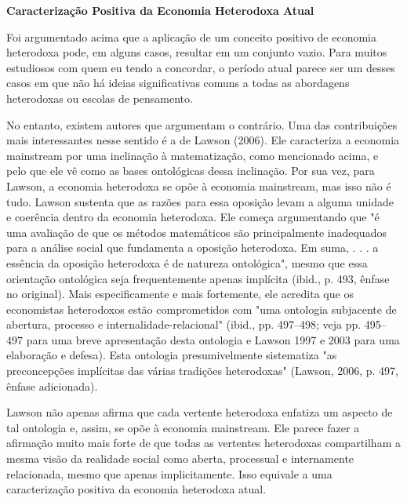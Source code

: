 \documentclass[12pt]{article}
\begin{document}
\textbf{Caracterização Positiva da Economia Heterodoxa Atual}

Foi argumentado acima que a aplicação de um conceito positivo de economia heterodoxa pode, em alguns casos, resultar em um conjunto vazio. Para muitos estudiosos com quem eu tendo a concordar, o período atual parece ser um desses casos em que não há ideias significativas comuns a todas as abordagens heterodoxas ou escolas de pensamento.

No entanto, existem autores que argumentam o contrário. Uma das contribuições mais interessantes nesse sentido é a de Lawson (2006). Ele caracteriza a economia mainstream por uma inclinação à matematização, como mencionado acima, e pelo que ele vê como as bases ontológicas dessa inclinação. Por sua vez, para Lawson, a economia heterodoxa se opõe à economia mainstream, mas isso não é tudo. Lawson sustenta que as razões para essa oposição levam a alguma unidade e coerência dentro da economia heterodoxa. Ele começa argumentando que "é uma avaliação de que os métodos matemáticos são principalmente inadequados para a análise social que fundamenta a oposição heterodoxa. Em suma, . . . a essência da oposição heterodoxa é de natureza ontológica", mesmo que essa orientação ontológica seja frequentemente apenas implícita (ibid., p. 493, ênfase no original). Mais especificamente e mais fortemente, ele acredita que os economistas heterodoxos estão comprometidos com "uma ontologia subjacente de abertura, processo e internalidade-relacional" (ibid., pp. 497–498; veja pp. 495–497 para uma breve apresentação desta ontologia e Lawson 1997 e 2003 para uma elaboração e defesa). Esta ontologia presumivelmente sistematiza "as preconcepções implícitas das várias tradições heterodoxas" (Lawson, 2006, p. 497, ênfase adicionada).

Lawson não apenas afirma que cada vertente heterodoxa enfatiza um aspecto de tal ontologia e, assim, se opõe à economia mainstream. Ele parece fazer a afirmação muito mais forte de que todas as vertentes heterodoxas compartilham a mesma visão da realidade social como aberta, processual e internamente relacionada, mesmo que apenas implicitamente. Isso equivale a uma caracterização positiva da economia heterodoxa atual.
\end{document}

